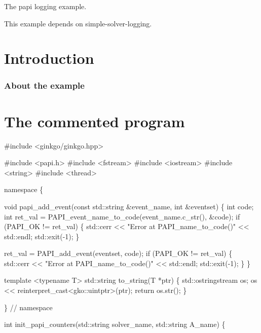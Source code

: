 The papi logging example.

This example depends on simple-\/solver-\/logging.

 \label{_Intro}%
 \label{_Introduction}%
\section*{Introduction}

\label{_Abouttheexample}%
\subsubsection*{About the example }

\label{_CommProg}%
 \section*{The commented program}


\begin{DoxyCode}
\textcolor{preprocessor}{#include <ginkgo/ginkgo.hpp>}


\textcolor{preprocessor}{#include <papi.h>}
\textcolor{preprocessor}{#include <fstream>}
\textcolor{preprocessor}{#include <iostream>}
\textcolor{preprocessor}{#include <string>}
\textcolor{preprocessor}{#include <thread>}


\textcolor{keyword}{namespace }\{


\textcolor{keywordtype}{void} papi\_add\_event(\textcolor{keyword}{const} std::string &event\_name, \textcolor{keywordtype}{int} &eventset)
\{
    \textcolor{keywordtype}{int} code;
    \textcolor{keywordtype}{int} ret\_val = PAPI\_event\_name\_to\_code(event\_name.c\_str(), &code);
    \textcolor{keywordflow}{if} (PAPI\_OK != ret\_val) \{
        std::cerr << \textcolor{stringliteral}{"Error at PAPI\_name\_to\_code()"} << std::endl;
        std::exit(-1);
    \}

    ret\_val = PAPI\_add\_event(eventset, code);
    \textcolor{keywordflow}{if} (PAPI\_OK != ret\_val) \{
        std::cerr << \textcolor{stringliteral}{"Error at PAPI\_name\_to\_code()"} << std::endl;
        std::exit(-1);
    \}
\}


\textcolor{keyword}{template} <\textcolor{keyword}{typename} T>
std::string to\_string(T *ptr)
\{
    std::ostringstream os;
    os << reinterpret\_cast<gko::uintptr>(ptr);
    \textcolor{keywordflow}{return} os.str();
\}


\}  \textcolor{comment}{// namespace}


\textcolor{keywordtype}{int} init\_papi\_counters(std::string solver\_name, std::string A\_name)
\{
\end{DoxyCode}


